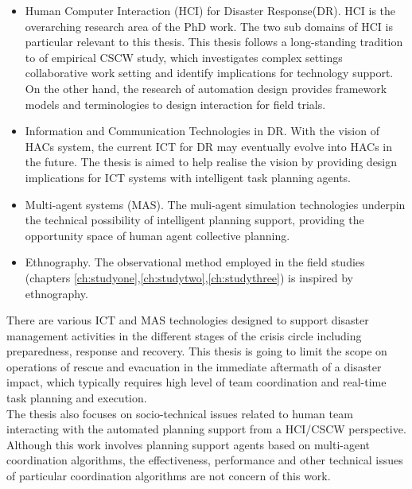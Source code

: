 \begin{itemize} 

  \item Human Computer Interaction (HCI) for Disaster Response(DR). HCI is the overarching research area of the PhD work. The two sub domains of HCI is particular relevant to this thesis. This thesis follows a long-standing tradition to of empirical CSCW study, which investigates complex settings collaborative work setting and identify implications for technology support. On the other hand, the research of automation design provides framework models and terminologies to design interaction for field trials.
  \item Information and Communication Technologies in DR. With the vision of HACs system, the current ICT for DR may eventually evolve into HACs in the future. The thesis is aimed to help realise the vision by providing design implications for ICT systems with intelligent task planning agents. 
  \item Multi-agent systems (MAS). The muli-agent simulation technologies underpin the technical possibility of intelligent planning support, providing the opportunity space of human agent collective planning. 
  \item Ethnography. The observational method employed in the field studies (chapters \ref{ch:studyone},\ref{ch:studytwo},\ref{ch:studythree}) is inspired by ethnography.
\end{itemize}

There are various ICT and MAS technologies designed to support disaster management activities in the different stages of the crisis circle including preparedness, response and recovery. This thesis is going to limit the scope on operations of rescue and evacuation in the immediate aftermath of a disaster impact, which typically requires high level of team coordination and real-time task planning and execution.\\ 

The thesis also focuses on socio-technical issues related to human team interacting with the automated planning support from a HCI/CSCW perspective. Although this work involves planning support agents based on multi-agent coordination algorithms, the effectiveness, performance and other technical issues of particular coordination algorithms are not concern of this work.\\

